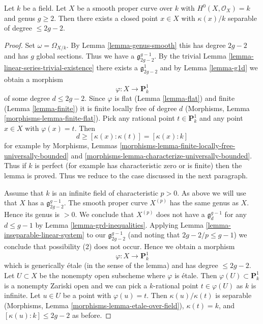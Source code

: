 \begin{lemma}
\label{lemma-point-over-separable-extension}
Let $k$ be a field. Let $X$ be a smooth proper curve over $k$
with $H^0(X, \mathcal{O}_X) = k$ and genus $g \geq 2$.
Then there exists a closed point $x \in X$ with
$\kappa(x)/k$ separable of degree $\leq 2g - 2$.
\end{lemma}

\begin{proof}
Set $\omega = \Omega_{X/k}$. By
Lemma \ref{lemma-genus-smooth} this has degree $2g - 2$
and has $g$ global sections. Thus we have a $\mathfrak g^{g - 1}_{2g - 2}$.
By the trivial Lemma \ref{lemma-linear-series-trivial-existence}
there exists a $\mathfrak g^1_{2g - 2}$
and by Lemma \ref{lemma-g1d} we obtain a morphism
$$
\varphi : X \longrightarrow \mathbf{P}^1_k
$$
of some degree $d \leq 2g - 2$. Since $\varphi$ is flat
(Lemma \ref{lemma-flat}) and finite
(Lemma \ref{lemma-finite})
it is finite locally free of degree $d$
(Morphisms, Lemma \ref{morphisms-lemma-finite-flat}).
Pick any rational point $t \in \mathbf{P}^1_k$
and any point $x \in X$ with $\varphi(x) = t$.
Then
$$
d \geq [\kappa(x) : \kappa(t)] = [\kappa(x) : k]
$$
for example by
Morphisms, Lemmas \ref{morphisms-lemma-finite-locally-free-universally-bounded}
and \ref{morphisms-lemma-characterize-universally-bounded}.
Thus if $k$ is perfect (for example has characteristic zero
or is finite) then the lemma is proved. Thus we reduce to the
case discussed in the next paragraph.

\medskip\noindent
Assume that $k$ is an infinite field of characteristic $p > 0$.
As above we will use that $X$ has a $\mathfrak g^{g - 1}_{2g - 2}$.
The smooth proper curve $X^{(p)}$ has the same genus as $X$.
Hence its genus is $> 0$. We conclude that $X^{(p)}$ does not have a
$\mathfrak g^{g - 1}_d$ for any $d \leq g - 1$ by
Lemma \ref{lemma-grd-inequalities}.
Applying Lemma \ref{lemma-inseparable-linear-system}
to our $\mathfrak g^{g - 1}_{2g - 2}$ (and noting that $2g - 2/p \leq g - 1$)
we conclude that possibility (2) does not occur. Hence we obtain a morphism
$$
\varphi : X \longrightarrow \mathbf{P}^1_k
$$
which is generically \'etale (in the sense of the lemma)
and has degree $\leq 2g - 2$. Let $U \subset X$ be the nonempty
open subscheme where $\varphi$ is \'etale. Then
$\varphi(U) \subset \mathbf{P}^1_k$ is a nonempty Zariski open
and we can pick a $k$-rational point $t \in \varphi(U)$ as $k$ is infinite.
Let $u \in U$ be a point with $\varphi(u) = t$.
Then $\kappa(u)/\kappa(t)$ is separable
(Morphisms, Lemma \ref{morphisms-lemma-etale-over-field}),
$\kappa(t) = k$, and $[\kappa(u) : k] \leq 2g - 2$ as before.
\end{proof}

